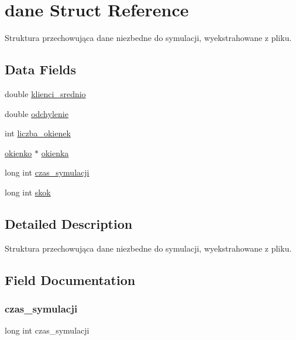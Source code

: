 \hypertarget{structdane}{}\section{dane Struct Reference}
\label{structdane}


Struktura przechowująca dane niezbedne do symulacji, wyekstrahowane z pliku.  


\subsection*{Data Fields}
\begin{DoxyCompactItemize}
\item 
double \hyperlink{structdane_a33bb3f25d776d0e10089695c7994ff4e}{klienci\+\_\+srednio}
\item 
double \hyperlink{structdane_aa30144067a7b85b6fad270378f9a12b8}{odchylenie}
\item 
int \hyperlink{structdane_abf7971cf83feea5113c1c7ddbdecd5a3}{liczba\+\_\+okienek}
\item 
\hyperlink{structokienko}{okienko} $\ast$ \hyperlink{structdane_a6e2a3c026fc959ef68208e1651f83d81}{okienka}
\item 
long int \hyperlink{structdane_a00723ffaad97a9785b076dbc551763c7}{czas\+\_\+symulacji}
\item 
long int \hyperlink{structdane_abf45c744fd4547efb397b53149ccac62}{skok}
\end{DoxyCompactItemize}


\subsection{Detailed Description}
Struktura przechowująca dane niezbedne do symulacji, wyekstrahowane z pliku. 

\subsection{Field Documentation}
\mbox{\label{structdane_a00723ffaad97a9785b076dbc551763c7}} 
\subsubsection{\texorpdfstring{czas\+\_\+symulacji}{czas\_symulacji}}
{\footnotesize\ttfamily long int czas\+\_\+symulacji}

